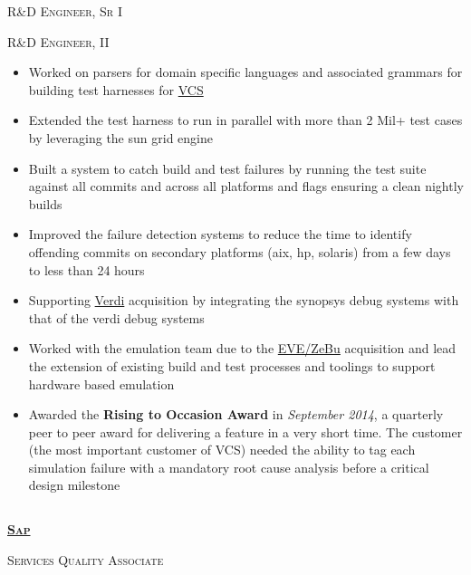 \documentclass{article}
\begin{document}
{\raggedright{\textsc{R\&D Engineer, Sr I}}} \hfill {}

{\raggedright{\textsc{R\&D Engineer, II}}} \hfill {}

\begin{itemize}[noitemsep,nolistsep]
\item Worked on parsers for domain specific languages and associated grammars for building test harnesses for \href{https://www.synopsys.com/verification/simulation/vcs.html}{VCS}
\item Extended the test harness to run in parallel with more than 2 Mil+ test cases by leveraging the sun grid engine
\item Built a system to catch build and test failures by running the test suite against all commits and across all platforms and flags ensuring a clean nightly builds
\item Improved the failure detection systems to reduce the time to identify offending commits on secondary platforms (aix, hp, solaris) from a few days to less than 24 hours
\item Supporting \href{https://www.synopsys.com/verification/debug/verdi.html}{Verdi} acquisition by integrating the synopsys debug systems with that of the verdi debug systems
\item Worked with the emulation team due to the \href{https://www.synopsys.com/verification/emulation.html}{EVE/ZeBu} acquisition and lead the extension of existing build and test processes and toolings to support hardware based emulation
\item Awarded the \textbf{Rising to Occasion Award} in \textit{September 2014}, a quarterly peer to peer award for delivering a feature in a very short time. The customer (the most important customer of VCS) needed the ability to tag each simulation failure with a mandatory root cause analysis before a critical design milestone
\end{itemize}

\subsection[Sap]{}
{\raggedright{\textsc{\textbf{\href{https://www.sap.com/index.html}{Sap}}}}} \hfill {}

{\raggedright{\textsc{Services Quality Associate}}} \hfill {}
\end{document}
